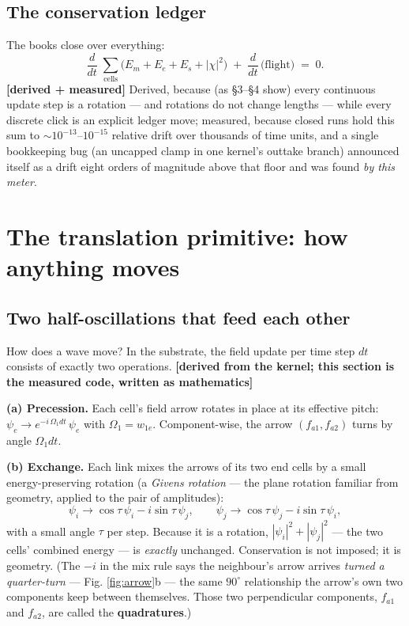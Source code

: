 \subsection{The conservation ledger}\label{the-conservation-ledger}

The books close over everything:
\[\frac{d}{dt}\;\sum_{\text{cells}}\Big(E_m + E_e + E_s + |\chi|^2\Big)
  \;+\; \frac{d}{dt}\,\big(\text{flight}\big) \;=\; 0 .\]
\textbf{{[}derived + measured{]}} Derived, because (as §3--§4 show)
every continuous update step is a rotation --- and rotations do not
change lengths --- while every discrete click is an explicit ledger
move; measured, because closed runs hold this sum to
\(\sim 10^{-13}\)--\(10^{-15}\) relative drift over thousands of time
units, and a single bookkeeping bug (an uncapped clamp in one kernel's
outtake branch) announced itself as a drift eight orders of magnitude
above that floor and was found \emph{by this meter}.

\section{The translation primitive: how anything
moves}\label{the-translation-primitive-how-anything-moves}

\subsection{Two half-oscillations that feed each
other}\label{two-half-oscillations-that-feed-each-other}

How does a wave move? In the substrate, the field update per time step
\(dt\) consists of exactly two operations. \textbf{{[}derived from the
kernel; this section is the measured code, written as mathematics{]}}

\textbf{(a) Precession.} Each cell's field arrow rotates in place at its
effective pitch: \(\psi_e \to e^{-i\,\Omega_1 dt}\,\psi_e\) with
\(\Omega_1 = w_{1e}\). Component-wise, the arrow \((f_{a1}, f_{a2})\)
turns by angle \(\Omega_1 dt\).

\textbf{(b) Exchange.} Each link mixes the arrows of its two end cells
by a small energy-preserving rotation (a \emph{Givens rotation} --- the
plane rotation familiar from geometry, applied to the pair of
amplitudes): \[\psi_i \to \cos\tau\,\psi_i - i\sin\tau\,\psi_j, \qquad
  \psi_j \to \cos\tau\,\psi_j - i\sin\tau\,\psi_i,\] with a small angle
\(\tau\) per step. Because it is a rotation, \(|\psi_i|^2 + |\psi_j|^2\)
--- the two cells' combined energy --- is \emph{exactly} unchanged.
Conservation is not imposed; it is geometry. (The \(-i\) in the mix rule
says the neighbour's arrow arrives \emph{turned a quarter-turn} --- Fig.
\ref{fig:arrow}b --- the same \(90^\circ\) relationship the arrow's own
two components keep between themselves. Those two perpendicular
components, \(f_{a1}\) and \(f_{a2}\), are called the
\textbf{quadratures}.)

